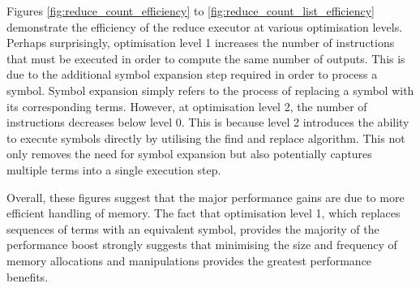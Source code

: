 Figures \ref{fig:reduce_count_efficiency} to \ref{fig:reduce_count_list_efficiency} demonstrate the efficiency of the reduce executor at various optimisation levels. Perhaps surprisingly, optimisation level 1 increases the number of instructions that must be executed in order to compute the same number of outputs. This is due to the additional symbol expansion step required in order to process a symbol. Symbol expansion simply refers to the process of replacing a symbol with its corresponding terms. However, at optimisation level 2, the number of instructions decreases below level 0. This is because level 2 introduces the ability to execute symbols directly by utilising the find and replace algorithm. This not only removes the need for symbol expansion but also potentially captures multiple terms into a single execution step.

Overall, these figures suggest that the major performance gains are due to more efficient handling of memory. The fact that optimisation level 1, which replaces sequences of terms with an equivalent symbol, provides the majority of the performance boost strongly suggests that minimising the size and frequency of memory allocations and manipulations provides the greatest performance benefits. 




